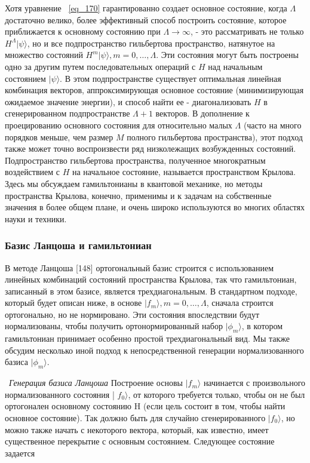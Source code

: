 \documentclass[11pt]{article}
\begin{document}
Хотя уравнение ~\ref{eq_170} гарантированно создает основное состояние, когда $\Lambda$ достаточно велико, более эффективный способ построить состояние, которое приближается к основному состоянию при $\Lambda \to \infty$, - это рассматривать не только $H^{\Lambda}|\psi \rangle$, но и все подпространство гильбертова пространство, натянутое на множество состояний $H^m |\psi \rangle, m = 0,\dots, \Lambda$. Эти состояния могут быть построены одно за другим путем последовательных операций с $H$ над начальным состоянием $| \psi\rangle $. В этом подпространстве существует оптимальная линейная комбинация векторов, аппроксимирующая основное состояние (минимизирующая ожидаемое значение энергии), и способ найти ее - диагонализовать $H$ в
 сгенерированном подпространстве $\Lambda + 1$ векторов. В дополнение к проецированию основного состояния для относительно малых $\Lambda$ (часто на много порядков меньше, чем размер $M$ полного гильбертова пространства), этот подход также может точно воспроизвести ряд низколежащих возбужденных состояний. Подпространство гильбертова пространства, полученное многократным воздействием с $H$ на начальное состояние, называется пространством Крылова. Здесь мы обсуждаем гамильтонианы в квантовой механике, но методы пространства Крылова, конечно, применимы и к задачам на собственные значения в более общем плане, и очень широко используются во многих областях науки и техники.

\subsubsection{Базис Ланцоша и гамильтониан}
В методе Ланцоша [148] ортогональный базис строится с использованием линейных комбинаций состояний пространства Крылова, так что гамильтониан, записанный в этом базисе, является трехдиагональным. В стандартном подходе, который будет описан ниже, в основе ${| f_m \rangle}, m = 0,\dots , \Lambda$, сначала строится ортогонально, но не нормировано. Эти состояния впоследствии будут нормализованы, чтобы получить ортонормированный набор {$| \phi_m \rangle$}, в котором гамильтониан принимает особенно простой трехдиагональный вид. Мы также обсудим несколько иной подход к непосредственной генерации нормализованного базиса {$| \phi_m \rangle$}.

~\emph{Генерация базиса Ланцоша}
Построение основы {$| f_m \rangle$} начинается с произвольного нормализованного состояния | $f_0 \rangle$, от которого требуется только, чтобы он не был ортогонален основному состоянию H (если цель состоит в том, чтобы найти основное состояние). Так должно быть для случайно сгенерированного $| f_0 \rangle $, но можно также начать с некоторого вектора, который, как известно, имеет существенное перекрытие с основным состоянием. Следующее состояние задается
\end{document}
